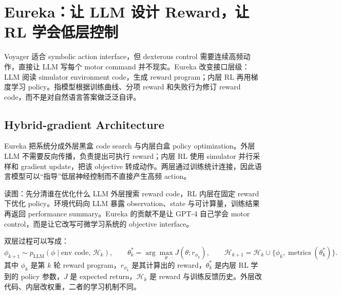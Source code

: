 \section{Eureka：让 LLM 设计 Reward，让 RL 学会低层控制}

Voyager 适合 symbolic action interface，但 dexterous control 需要连续高频动作，直接让 LLM 写每个 motor command 并不现实。Eureka 改变接口层级：LLM 阅读 simulator environment code，生成 reward program；内层 RL 再用梯度学习 policy。指模型根据训练曲线、分项 reward 和失败行为修订 reward code，而不是对自然语言答案做泛泛自评。

\subsection{Hybrid-gradient Architecture}

Eureka 把系统分成外层黑盒 code search 与内层白盒 policy optimization。外层 LLM 不需要反向传播，负责提出可执行 reward；内层 RL 使用 simulator 并行采样和 gradient update，把该 objective 转成动作。两层通过训练统计连接，因此语言模型可以“指导”低层神经控制而不直接产生高频 action。


\begin{knowledgebox}{读图：先分清谁在优化什么}
LLM 外层搜索 reward code，RL 内层在固定 reward 下优化 policy。环境代码向 LLM 暴露 observation、state 与可计算量，训练结果再返回 performance summary。Eureka 的贡献不是让 GPT-4 自己学会 motor control，而是让它改写可微学习系统的 objective interface。
\end{knowledgebox}

双层过程可以写成：
\[
\phi_{k+1}\sim p_{\mathrm{LLM}}(\phi\mid \text{env code},\,\mathcal{H}_k),
\qquad
\theta_k^*=\arg\max_\theta J(\theta; r_{\phi_k}),
\qquad
\mathcal{H}_{k+1}=\mathcal{H}_k\cup\{\phi_k,\operatorname{metrics}(\theta_k^*)\}.
\]
其中 $\phi_k$ 是第 $k$ 轮 reward program，$r_{\phi_k}$ 是其计算出的 reward，$\theta_k^*$ 是内层 RL 学到的 policy 参数，$J$ 是 expected return，$\mathcal{H}_k$ 是 reward 与训练反馈历史。外层改代码、内层改权重，二者的学习机制不同。


